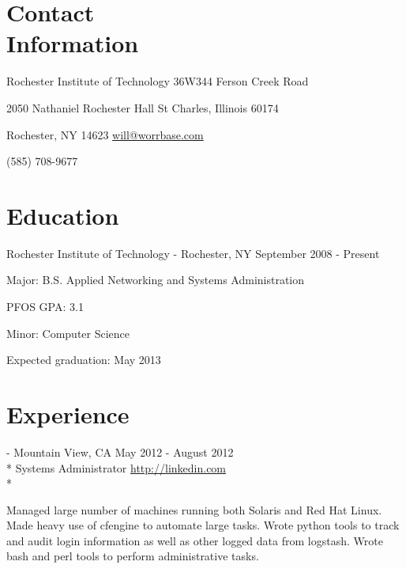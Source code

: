 \documentclass[letter,margin,line]{resume}
\newcommand{\rurl}[1]{\hfill {\footnotesize \url{#1}}}
\newcommand{\rdate}[1]{\hfill {\small #1}}
\renewcommand{\employer}[5]{\item[#1] - #2 \rdate{#3} \\* #4 \rurl{#5} \\*}
\begin{document}
\begin{resume}
\section{\mysidestyle Contact \\ Information} \vspace{2mm}
	\begin{asparablank}
		\item Rochester Institute of Technology \hfill 36W344 Ferson Creek Road
		\item 2050 Nathaniel Rochester Hall \hfill St Charles, Illinois 60174
		\item Rochester, NY 14623 \hfill
		\href{mailto:will@worrbase.com}{will@worrbase.com}
		\item (585) 708-9677 \hfill
	\end{asparablank}

\section{\mysidestyle Education}
	\begin{compactdesc}
		\item[Rochester Institute of Technology] - Rochester, NY \rdate{September 2008 - Present}
		\begin{compactitem} { \small
			\item Major: B.S. Applied Networking and Systems Administration
			\item PFOS GPA: 3.1
			\item Minor: Computer Science
			\item Expected graduation: May 2013
		} \end{compactitem}
	\end{compactdesc}

\section{\mysidestyle Experience}
	\begin{asparadesc}
		\employer{LinkedIn}{Mountain View, CA}{May 2012 - August 2012}{Systems Administrator}{http://linkedin.com}

		\small
		Managed large number of machines running both Solaris and Red Hat Linux. Made heavy use of cfengine
		to automate large tasks. Wrote python tools to track and audit login information
		as well as other logged data from logstash. Wrote bash and perl tools to perform administrative tasks.
		\normalsize
		\\


\end{asparadesc}
\end{resume}
\end{document}
